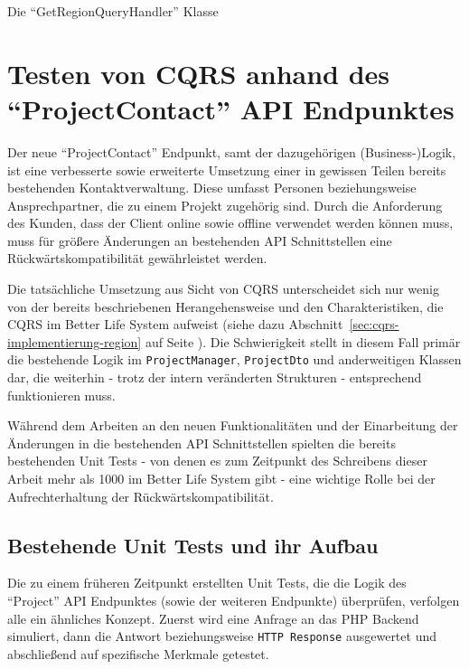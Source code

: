\documentclass[a4paper,12pt,twoside]{scrreprt}
\begin{document}
\begin{listing}[ht]
    \inputminted[fontsize=\footnotesize,linenos,breaklines]{php}{code/get_region_queryhandler.php}
    \caption[Die \enquote{GetRegionQueryHandler} Klasse]{Die \enquote{GetRegionQueryHandler} Klasse}
    \label{code:get-region-queryhandler}
\end{listing}

\section{Testen von CQRS anhand des \enquote{ProjectContact} API Endpunktes}
\label{sec:cqrs-implementierung-project-contact}
Der neue \enquote{ProjectContact} Endpunkt, samt der dazugehörigen (Business-)Logik, ist eine verbesserte sowie erweiterte Umsetzung einer in gewissen Teilen bereits bestehenden Kontaktverwaltung. Diese umfasst Personen beziehungsweise Ansprechpartner, die zu einem Projekt zugehörig sind. Durch die Anforderung des Kunden, dass der Client online sowie offline verwendet werden können muss, muss für größere Änderungen an bestehenden API Schnittstellen eine Rückwärtskompatibilität gewährleistet werden.

\medskip

Die tatsächliche Umsetzung aus Sicht von CQRS unterscheidet sich nur wenig von der bereits beschriebenen Herangehensweise und den Charakteristiken, die CQRS im Better Life System aufweist (siehe dazu Abschnitt~\ref{sec:cqrs-implementierung-region} auf Seite \pageref{sec:cqrs-implementierung-region}). Die Schwierigkeit stellt in diesem Fall primär die bestehende Logik im \texttt{ProjectManager}, \texttt{ProjectDto} und anderweitigen Klassen dar, die weiterhin - trotz der intern veränderten Strukturen - entsprechend funktionieren muss.

\medskip

Während dem Arbeiten an den neuen Funktionalitäten und der Einarbeitung der Änderungen in die bestehenden API Schnittstellen spielten die bereits bestehenden Unit Tests - von denen es zum Zeitpunkt des Schreibens dieser Arbeit mehr als 1000 im Better Life System gibt - eine wichtige Rolle bei der Aufrechterhaltung der Rückwärtskompatibilität.

\subsection{Bestehende Unit Tests und ihr Aufbau}
\label{sub-sec:v1-unit-tests}
Die zu einem früheren Zeitpunkt erstellten Unit Tests, die die Logik des \enquote{Project} API Endpunktes (sowie der weiteren Endpunkte) überprüfen, verfolgen alle ein ähnliches Konzept. Zuerst wird eine Anfrage an das PHP Backend simuliert, dann die Antwort beziehungsweise \texttt{HTTP Response} ausgewertet und abschließend auf spezifische Merkmale getestet.
\end{document}
